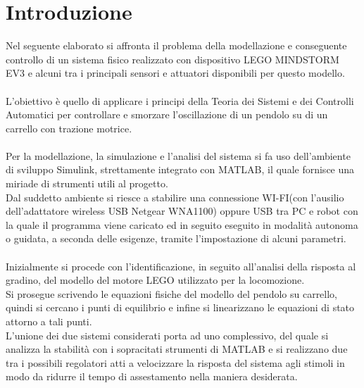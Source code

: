 \chapter{Introduzione}
Nel seguente elaborato si affronta il problema della modellazione e conseguente controllo di un sistema fisico realizzato con dispositivo LEGO MINDSTORM EV3 e alcuni tra i principali sensori e attuatori disponibili per questo modello.\\\\
L'obiettivo è quello di applicare i principi della Teoria dei Sistemi e dei Controlli Automatici per controllare e smorzare l'oscillazione di un pendolo su di un carrello con trazione motrice.\\\\
Per la modellazione, la simulazione e l'analisi del sistema si fa uso dell'ambiente di sviluppo Simulink, strettamente integrato con MATLAB, il quale fornisce una miriade di strumenti utili al progetto.\\
Dal suddetto ambiente si riesce a stabilire una connessione WI-FI(con l'ausilio dell'adattatore wireless USB Netgear WNA1100) oppure USB tra PC e robot con la quale il programma viene caricato ed in seguito eseguito in modalità autonoma o guidata, a seconda delle esigenze, tramite l'impostazione di alcuni parametri.\\\\
Inizialmente si procede con l'identificazione, in seguito all'analisi della risposta al gradino, del modello del motore LEGO utilizzato per la locomozione.\\
Si prosegue scrivendo le equazioni fisiche del modello del pendolo su carrello, quindi si cercano i punti di equilibrio e  infine si linearizzano le equazioni di stato attorno a tali punti.\\
L'unione dei due sistemi considerati porta ad uno complessivo, del quale si analizza la stabilità con i sopracitati strumenti di MATLAB e si realizzano due tra i possibili regolatori atti a velocizzare la risposta del sistema agli stimoli in modo da ridurre il tempo di assestamento nella maniera desiderata.\\



